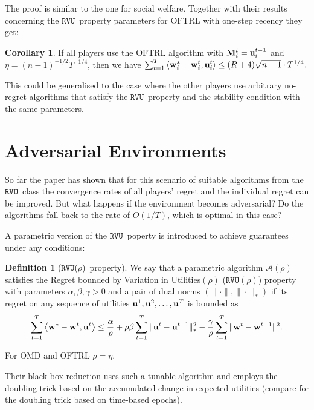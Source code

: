 \documentclass[a4paper]{article}
\theoremstyle{definition}
\newtheorem{defn}[theorem]{Definition}
\newtheorem{corollary}[theorem]{Corollary}
\newcommand{\myprop}{\ensuremath{\texttt{RVU}}}
\newcommand{\mst}{\ensuremath{w}}
\newcommand{\A}{\ensuremath{\mathcal{A}}}
\newcommand{\knob}{\ensuremath{\rho}}
\renewcommand{\vec}[1]{\ensuremath{{\bf #1}}}
\newcommand{\dotp}[2]{\ensuremath{\left\langle #1, #2 \right\rangle}}
\begin{document}
The proof is similar to the one for social welfare.
Together with their results concerning the \myprop~property parameters for OFTRL with one-step recency they get:

\begin{corollary}\label{cor:oftrl-bound}
If all players use the OFTRL algorithm with $\vec{M}_i^t =
\vec{u}_i^{t-1}$ and $\eta = (n-1)^{-1/2}T^{-1/4}$, then we have
$\sum_{t=1}^{T} \dotp{\vec{\mst}_i^*-\vec{\mst}_i^t}{ \vec{u}_i^t}\leq
(R+4)\sqrt{n-1}\cdot T^{1/4}.$
\end{corollary}

This could be generalised to the case where the other players use
arbitrary no-regret algorithms that satisfy the \myprop~property and
the stability condition with the same parameters.



\section{Adversarial Environments}
So far the paper has shown that for this scenario of suitable
algorithms from the \myprop~class the convergence rates of all players'
regret and the individual regret can be improved.
But what happens if the environment becomes adversarial?
Do the algorithms fall back to the rate of $O(1/T)$, which is optimal
in this case?

A parametric version of the \myprop~poperty is introduced to  achieve
guarantees under any conditions:

\begin{defn}[\myprop(\knob)~property]
  We say that a parametric algorithm $\A(\knob)$ satisfies the Regret
  bounded by Variation in Utilities$(\knob)$ ($\myprop(\knob)$)
  property with parameters $\alpha, \beta, \gamma > 0$ and a pair of
  dual norms $(\|\cdot\|, \|\cdot\|_*)$ if its regret on any sequence
  of utilities $\vec{u}^1, \vec{u}^2, \ldots, \vec{u}^T$ is bounded
  as \begin{equation*} \sum_{t=1}^{T} \dotp{\vec{w}^*- \vec{w}^t}{\vec{u}^t} \leq \frac{\alpha}{\knob}
  +\knob\beta \sum_{t=1}^{T} \| \vec{u}^t - \vec{u}^{t-1}\|_*^2
  - \frac{\gamma}{\knob}\sum_{t=1}^{T} \|\vec{w}^{t}
  - \vec{w}^{t-1}\|^2.  \label{eqn:reg-form-param} \end{equation*} \label{defn:alg-class-param}
\end{defn}

For OMD and OFTRL $ \knob = \eta$.

Their black-box reduction uses such a tunable algorithm and employs
the doubling trick based on the accumulated change in
expected utilities (compare \cite[p.130]{Foundations} for the doubling
trick based on time-based epochs).
\end{document}
